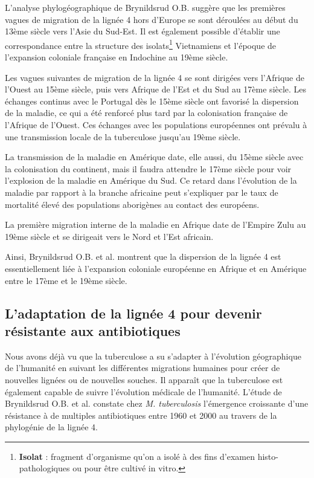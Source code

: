 \documentclass[twoside,a4paper,11pt,frenchb,openany]{report}
\begin{document}

L'analyse phylogéographique de Brynildsrud O.B. suggère que les premières vagues de migration de la lignée 4 hors d'Europe se sont déroulées au début du 13ème siècle vers l'Asie du Sud-Est. Il est également possible d'établir une correspondance entre la structure des isolats\footnote{\textbf{Isolat} : fragment d'organisme qu'on a isolé à des fins d'examen histo-pathologiques ou pour être cultivé in vitro.} Vietnamiens et l'époque de l'expansion coloniale française en Indochine au 19ème siècle.

Les vagues suivantes de migration de la lignée 4 se sont dirigées vers l'Afrique de l'Ouest au 15ème siècle, puis vers Afrique de l'Est et du Sud au 17ème siècle. Les échanges continus avec le Portugal dès le 15ème siècle ont favorisé la dispersion de la maladie, ce qui a été renforcé plus tard par la colonisation française de l'Afrique de l'Ouest.  Ces échanges avec les populations européennes ont prévalu à une transmission locale de la tuberculose jusqu'au 19ème siècle. 

La transmission de la maladie en Amérique date, elle aussi, du 15ème siècle avec la colonisation du continent, mais il faudra attendre le 17ème siècle pour voir l'explosion de la maladie en Amérique du Sud. Ce retard dans l'évolution de la maladie par rapport à la branche africaine peut s'expliquer par le taux de mortalité élevé des populations aborigènes au contact des européens.

La première migration interne de la maladie en Afrique date de l'Empire Zulu au 19ème siècle et se dirigeait vers le Nord et l'Est africain.

Ainsi, Brynildsrud O.B. et al. montrent que la dispersion de la lignée 4 est essentiellement liée à l'expansion coloniale européenne en Afrique et en Amérique entre le 17ème et le 19ème siècle.


\subsection{L'adaptation de la lignée 4 pour devenir résistante aux antibiotiques}

Nous avons déjà vu que la tuberculose a su s'adapter à l'évolution géographique de l'humanité en suivant les différentes migrations humaines pour créer de nouvelles lignées ou de nouvelles souches. Il apparaît que la tuberculose est également capable de suivre l'évolution médicale de l'humanité. L'étude de Brynildsrud O.B. et al.\cite{brynildsrud} constate chez \textit{M. tuberculosis} l'émergence croissante d'une résistance à de multiples antibiotiques entre 1960 et 2000 au travers de la phylogénie de la lignée 4.
\end{document}
